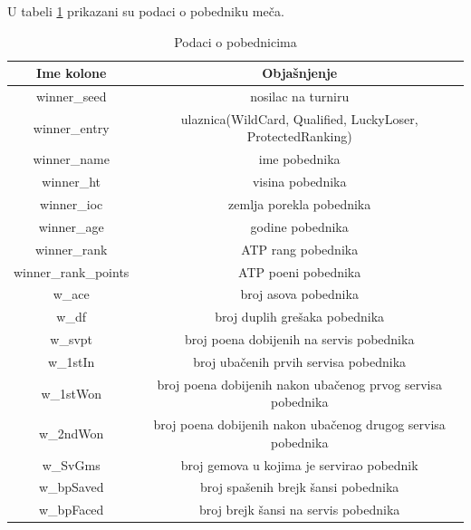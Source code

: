 \documentclass[a4paper]{article}
\begin{document}
U tabeli \ref{table:pobednici} prikazani su podaci o pobedniku meča.
\begin{table}[H]
	\begin{center}
		\begin{tabular}{ | c | c | } 
			\hline
			Ime kolone & Objašnjenje \\ 
			\hline
			winner\_seed & nosilac na turniru \\
			winner\_entry & ulaznica(WildCard, Qualified, LuckyLoser, ProtectedRanking) \\
			winner\_name & ime pobednika \\
			winner\_ht & visina pobednika \\
			winner\_ioc & zemlja porekla pobednika \\
			winner\_age & godine pobednika \\
			winner\_rank & ATP rang pobednika \\
			winner\_rank\_points & ATP poeni pobednika \\
			w\_ace & broj asova pobednika \\
			w\_df & broj duplih grešaka pobednika \\ 
			w\_svpt & broj poena dobijenih na servis pobednika \\
			w\_1stIn & broj ubačenih prvih servisa pobednika \\
			w\_1stWon & broj poena dobijenih nakon ubačenog prvog servisa pobednika \\
			w\_2ndWon & broj poena dobijenih nakon ubačenog drugog servisa pobednika \\
			w\_SvGms & broj gemova u kojima je servirao pobednik \\
			w\_bpSaved & broj spašenih brejk šansi pobednika \\
			w\_bpFaced & broj brejk šansi na servis pobednika \\ 
			\hline
		\end{tabular}
	\end{center}
	\caption{Podaci o pobednicima}
	\label{table:pobednici}
\end{table}
\end{document}
